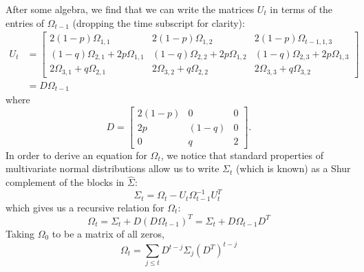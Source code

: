 \documentclass{article}
\begin{document}
After some algebra, we find that we can write the matrices $U_t$ in terms of the entries of $\Omega_{t-1}$ (dropping the time subscript for clarity): 
\begin{align}
U_t &=\left[ \begin{array}{ccc}
2(1-p)\Omega_{1,1}  & 2(1-p) \Omega_{1,2}  & 2(1-p) \Omega_{t-1,1,3} \\
(1-q) \Omega_{2,1} + 2 p \Omega_{1,1}&(1-q)\Omega_{2,2} + 2p \Omega_{1,2}  &(1-q) \Omega_{2,3} + 2p \Omega_{1,3}\\
2\Omega_{3,1} + q \Omega_{2,1} &2 \Omega_{3,2} + q \Omega_{2,2}  &2\Omega_{3,3} + q \Omega_{3,2}
\end{array}\right]\\
&= D\Omega_{t-1}
\end{align}
where
\begin{equation}
D = \left[ \begin{array}{ccc}
2(1-p)  &0  &0 \\
2p  & (1-q)  & 0 \\
0 & q  &2
\end{array}\right].
\end{equation}
In order to derive an equation for $\Omega_t$, we notice that standard properties of multivariate normal distributions allow us to write $\Sigma_t$ (which is known) as a Shur complement of the blocks in $\hat{\Sigma}$:
 \begin{equation}
 \Sigma_t = \Omega_{t} - U_t \Omega_{t-1}^{-1}U_t^T\
 \end{equation}
 which gives us a recursive relation for $\Omega_t$: 
 \begin{equation}
 \Omega_{t} =  \Sigma_t + D(D\Omega_{t-1})^T =  \Sigma_t + D\Omega_{t-1}D^T
 \end{equation}
 Taking $\Omega_{0}$ to be a matrix of all zeros, 
 \begin{equation}
  \Omega_{t} = \sum_{j\le t}D^{t-j}\Sigma_j \left(D^T\right)^{t-j}
 \end{equation}
 
\end{document}
